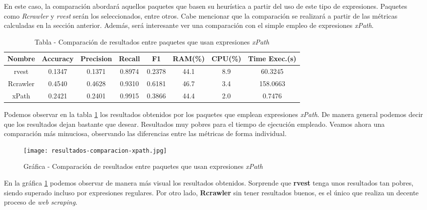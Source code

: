 En este caso, la comparación abordará aquellos paquetes que basen su heurística a partir del uso de este
tipo de expresiones. Paquetes como \emph{Rcrawler} y \emph{rvest} serán los seleccionados, entre otros.
Cabe mencionar que la comparación se realizará a partir de las métricas calculadas en la sección anterior.
Además, será interesante ver una comparación con el simple empleo de expresiones \emph{xPath}.

\begin{table}[h]
    \begin{center}
      \begin{tabular}{| c | c | c | c | c | c | c | c |} \hline 
       \textbf{Nombre} & \textbf{Accuracy} & \textbf{Precision}  & \textbf{Recall} & \textbf{F1} & \textbf{RAM(\%)} & \textbf{CPU(\%)} & \textbf{Time Exec.(s)} \\ \hline
       rvest & 0.1347 & 0.1371 & 0.8974 & 0.2378 & 44.1 & 8.9 & 60.3245 \\ \hline
       Rcrawler & 0.4540 & 0.4628 & 0.9310 & 0.6181 & 46.7 & 3.4 & 158.0663 \\ \hline
       xPath & 0.2421 & 0.2401 & 0.9915 & 0.3866 & 44.4 & 2.0 & 0.7476 \\ \hline
      \end{tabular}
      \caption{Tabla - Comparación de resultados entre paquetes que usan expresiones \emph{xPath}}
      \label{tab:tabla - comparacion de resultados entre paquetes que usan expresiones xpath}
    \end{center}
\end{table}

Podemos observar en la tabla \ref{tab:tabla - comparacion de resultados entre paquetes que usan expresiones xpath} los
resultados obtenidos por los paquetes que emplean expresiones \emph{xPath}. De manera general podemos decir
que los resultados dejan bastante que desear. Resultados muy pobres para el tiempo de ejecución empleado.
Veamos ahora una comparación más minuciosa, observando las diferencias entre las métricas de forma individual.

\begin{figure}[tphb]
    \centering
    \texttt{[image: resultados-comparacion-xpath.jpg]}
    \caption{Gráfica - Comparación de resultados entre paquetes que usan expresiones \emph{xPath}}
    \label{img:grafica - comparacion de resultados entre paquetes que usan expresiones xpath}
\end{figure}

En la gráfica \ref{img:grafica - comparacion de resultados entre paquetes que usan expresiones xpath} 
podemos observar de manera más visual los resultados obtenidos. Sorprende que \textbf{rvest} tenga unos 
resultados tan pobres, siendo superado incluso por expresiones regulares. Por otro lado, \textbf{Rcrawler} 
sin tener resultados buenos, es el único que realiza un decente proceso de \emph{web scraping}.

